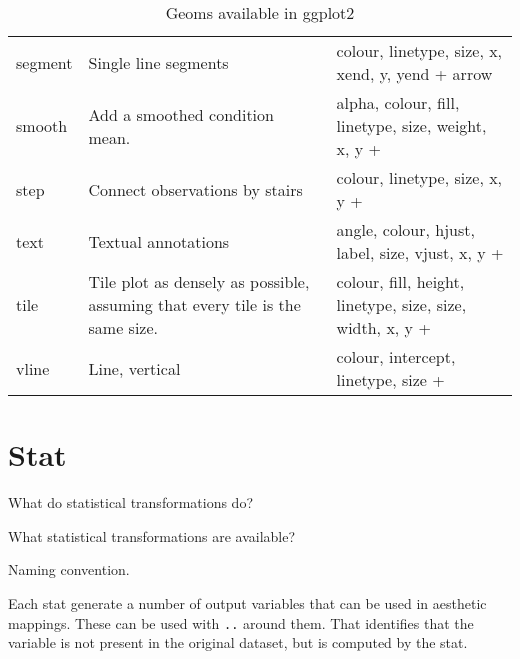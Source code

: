 \begin{table}
\begin{center}
\begin{tabular}{lp{2.5in}p{2.5in}}
    segment      & Single line segments                                                          & colour, linetype, size, x, xend, y, yend + arrow                                     \\
    smooth       & Add a smoothed condition mean.                                                & alpha, colour, fill, linetype, size, weight, x, y +                                  \\
    step         & Connect observations by stairs                                                & colour, linetype, size, x, y +                                                       \\
    text         & Textual annotations                                                           & angle, colour, hjust, label, size, vjust, x, y +                                     \\
    tile         & Tile plot as densely as possible, assuming that every tile is the same size.  & colour, fill, height, linetype, size, size, width, x, y +                            \\
    vline        & Line, vertical                                                                & colour, intercept, linetype, size +                                                  \\
    \bottomrule
  \end{tabular}
  \end{center}
  \caption{Geoms available in ggplot2}
  \label{tbl:geoms}
\end{table}



\section{Stat}
\label{sec:stat}

What do statistical transformations do?

What statistical transformations are available?

Naming convention.

Each stat generate a number of output variables that can be used in aesthetic mappings.  These can be used with {\tt ..} around them.  That identifies that the variable is not present in the original dataset, but is computed by the stat.

